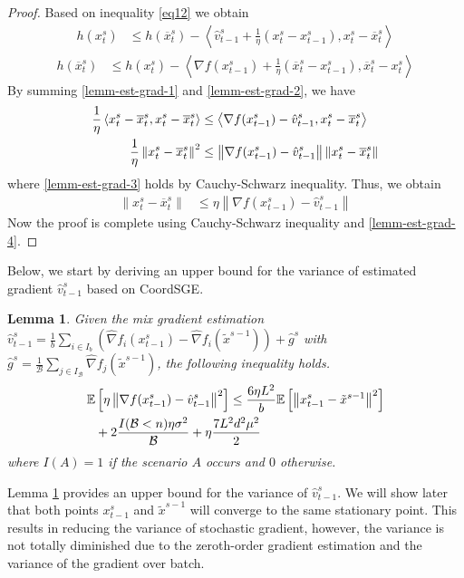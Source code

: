 \documentclass[iicol,sn-basic]{sn-jnl}
\theoremstyle{thmstyleone}%
\theoremstyle{thmstyletwo}%
\theoremstyle{thmstylethree}%
\newcommand*{\E}{\mathbb{E}}
\newcommand{\norm}[1]{\left\lVert#1\right\rVert}
\newcommand{\Iprod}[2]{\left\langle #1,#2\right\rangle}
\newtheorem{lemma}[theorem]{Lemma}
\begin{document}
\begin{proof}
Based on inequality \eqref{eq12} we obtain
\begin{align}
h(x_t^s)&\leq h(\overline{x}_t^s) - \Iprod{\hat{v}_{t-1}^s+\frac{1}{\eta}(x_t^s-x_{t-1}^s)}{x_t^s-\overline{x}_t^s}\label{lemm-est-grad-1}
\end{align}
\begin{align}
h(\overline{x}_t^s)&\leq h({x}_t^s) - \Iprod{\nabla f(x_{t-1}^s)+\frac{1}{\eta}(\overline{x}_t^s-x_{t-1}^s)}{\overline{x}_t^s-x_t^s}\label{lemm-est-grad-2}
\end{align}
By summing \eqref{lemm-est-grad-1} and \eqref{lemm-est-grad-2}, we have 
\begin{align}
\frac{1}{\eta}\Iprod{x_t^s -\overline{x}_t^s}{x_t^s -\overline{x}_t^s} &\leq \Iprod{\nabla f(x_{t-1}^s) -\hat{v}_{t-1}^s}{x_t^s -\overline{x}_t^s}\notag\\
\frac{1}{\eta}\norm{x_t^s -\overline{x}_t^s}^2 &\leq \norm{\nabla f(x_{t-1}^s) -\hat{v}_{t-1}^s}\norm{x_t^s -\overline{x}_t^s}\label{lemm-est-grad-3}
\end{align}
where \eqref{lemm-est-grad-3} holds by Cauchy-Schwarz inequality. 
Thus, we obtain
\begin{align}
\norm{x_t^s -\overline{x}_t^s} &\leq \eta\norm{\nabla f(x_{t-1}^s) -\hat{v}_{t-1}^s}\label{lemm-est-grad-4}
\end{align}
Now the proof is complete using Cauchy-Schwarz inequality and \eqref{lemm-est-grad-4}.
\end{proof}
Below, we start by deriving an upper bound for the variance of estimated gradient $\hat{v}_{t-1}^s$ based on CoordSGE. 
\begin{lemma}\label{var-estimate-lem}
Given the mix gradient estimation $\hat{v}_{t-1}^s = \frac{1}{b} \sum_{i\in I_b}\left(\hat{\nabla} f_{i}(x_{t-1}^s)-\hat{\nabla} f_{i}(\tilde{x}^{s-1})\right)+\hat{g}^s$ with $\hat{g}^s = \frac{1}{\mathcal{B}} \sum_{j\in I_{\mathcal{B}}} \hat{\nabla} f_j (\tilde{x}^{s-1})$, the following inequality holds. 
\begin{align}
\E&\left[\eta\norm{\nabla f(x_{t-1}^s)-{\hat{v}_{t-1}^s}}^2\right] \leq  \frac{6\eta L^2}{b}\E\left[\norm{x_{t-1}^s-\tilde{x}^{s-1}}^2\right]\notag\\
&+ 2\frac{I(\mathcal{B} < n)\eta \sigma ^2}{\mathcal{B}}+\eta \frac{7 L^2 d^2 \mu^2}{2}
\end{align}
where $I(A) = 1$ if the scenario $A$ occurs and $0$ otherwise.
\end{lemma}
Lemma \ref{var-estimate-lem} provides an upper bound for the variance of $\hat{v}_{t-1}^s$.  We will show later that both points $x_{t-1}^s$ and $\tilde{x}^{s-1}$ will converge to the same stationary point.  This results in reducing the variance of stochastic gradient, however, the variance is not totally diminished due to the zeroth-order gradient estimation and the variance of the gradient over batch.
\end{document}
